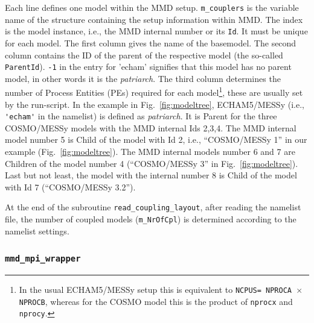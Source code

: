 \documentclass[twoside]{article}
\begin{document}
\begin{itemize}
Each line defines one model within the MMD setup. \verb|m_couplers| is the 
variable name of the structure containing the setup information
within MMD. The index is the  model instance, i.e., the  MMD internal number or 
its \verb|Id|. It must be unique for each model.
The first column gives the name of the basemodel. The second column contains 
 the ID of the parent of the respective model (the so-called 
\verb|ParentId|). \verb|-1| in the entry for 'echam' signifies 
that this model has no parent model, in other words it is the {\it patriarch}.
The third column determines the number of Process Entities (PEs) required for 
each model\footnote{In the usual  ECHAM5/MESSy setup this is equivalent to 
{\tt NCPUS= NPROCA $\times$ NPROCB}, whereas for the COSMO model this is the 
product of {\tt nprocx} 
and {\tt nprocy}.}, these are usually set by the run-script.
In the example in Fig.\ \ref{fig:modeltree}, ECHAM5/MESSy 
(i.e., \verb|'echam'| in the namelist) is defined  as {\it patriarch}. It 
is Parent for the three COSMO/MESSy models with the MMD internal Ids 2,3,4.
 The MMD internal model number 5 is Child of the model with Id 2, 
i.e., ``COSMO/MESSy 1'' in our example
(Fig.\ \ref{fig:modeltree}). The MMD internal  
models number 6 and 7 are Children of the model number 4 (``COSMO/MESSy 3'' in 
Fig.\ \ref{fig:modeltree}).
Last but not least, the model with the internal number 8 is Child of the model
with Id 7 (``COSMO/MESSy 3.2'').

At the end of the subroutine \verb|read_coupling_layout|, after
reading the namelist file, the number of coupled models 
(\verb|m_NrOfCpl|) is determined according to the namelist settings.     
\end{itemize}



\subsubsection{{\tt mmd\_mpi\_wrapper}}\label{sec:mpiwrapper}
\end{document}
